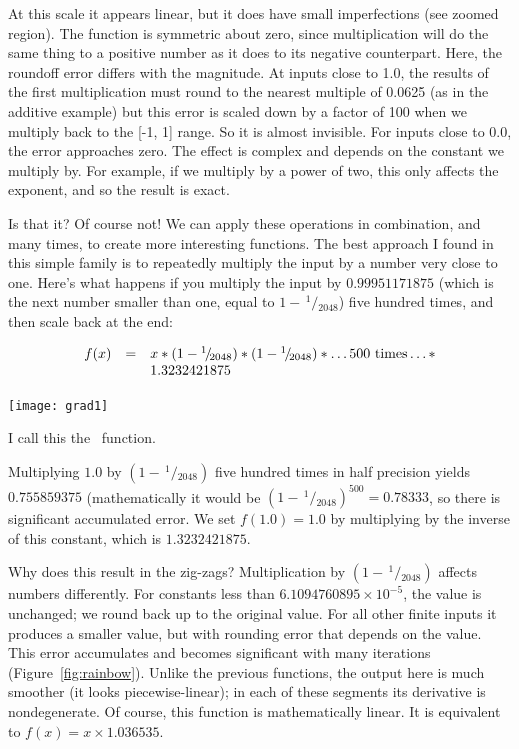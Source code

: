 \documentclass[twocolumn]{article}
\newcommand\sfrac[2]{\!{}\,^{#1}\!/{}\!_{#2}}
\begin{document}
At this scale it appears linear, but it does have small imperfections
(see zoomed region). The function is symmetric about zero, since
multiplication will do the same thing to a positive number as it does
to its negative counterpart. Here, the roundoff error differs with the
magnitude. At inputs close to 1.0, the results of the first
multiplication must round to the nearest multiple of 0.0625 (as in the
additive example) but this error is scaled down by a factor of 100
when we multiply back to the [-1, 1] range. So it is almost invisible.
For inputs close to 0.0, the error approaches zero. The effect is complex
and depends on the constant we multiply by. For example, if we multiply
by a power of two, this only affects the exponent, and so the result is
exact.

\medskip
Is that it? Of course not! We can apply these operations in
combination, and many times, to create more interesting functions. The
best approach I found in this simple family is to repeatedly multiply
the input by a number very close to one. Here's what happens if you
multiply the input by $0.99951171875$ (which is the next number
smaller than one, equal to $1 - \sfrac{1}{2048}$) five hundred times,
and then scale back at the end:

\[
\begin{array}{rcl}
  f(x) & = & x * (1 - \sfrac{1}{2048}) * (1 - \sfrac{1}{2048}) * \ldots \textrm{500 times} \ldots * \\
  \, & \, & 1.3232421875$$
\end{array}
\]

\begin{center}
\texttt{[image: grad1]}
\end{center}

I call this the \gradone\ function.

Multiplying $1.0$ by $(1 - \sfrac{1}{2048})$ five hundred times in
half precision yields $0.755859375$ (mathematically it would be $(1 -
\sfrac{1}{2048})^{500} = 0.78333$, so there is significant accumulated
error. We set $f(1.0) = 1.0$ by multiplying by the inverse of this
constant, which is $1.3232421875$.

Why does this result in the zig-zags? Multiplication by $(1 -
\sfrac{1}{2048})$ affects numbers differently. For constants less than
$6.1094760895 \times 10^{-5}$, the value is unchanged; we round back up to
the original value. For all other finite inputs it produces a smaller
value, but with rounding error that depends on the value. This error
accumulates and becomes significant with many iterations
(Figure~\ref{fig:rainbow}). Unlike the previous functions, the output
here is much smoother (it looks piecewise-linear); in each of these
segments its derivative is nondegenerate. Of course, this function is
mathematically linear. It is equivalent to $f(x) = x \times 1.036535$.
\end{document}
